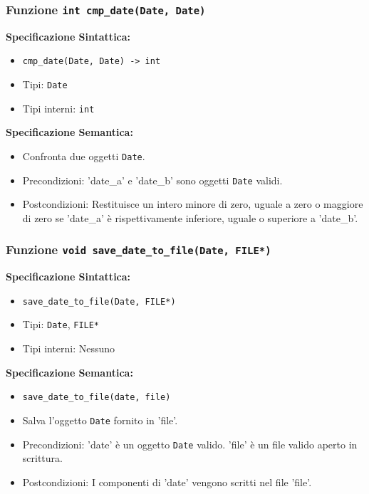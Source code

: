 \documentclass[11pt]{scrartcl} %
\begin{document}
\subsubsection{Funzione \texttt{int cmp\_date(Date, Date) }}

\textbf{Specificazione Sintattica:}
\begin{itemize}
	\item \texttt{cmp\_date(Date, Date) -> int}
	\item Tipi: \texttt{Date}
	\item Tipi interni: \texttt{int}
\end{itemize}

\textbf{Specificazione Semantica:}
\begin{itemize}
	\item Confronta due oggetti \texttt{Date}.
	\item Precondizioni: 'date\_a' e 'date\_b' sono oggetti \texttt{Date} validi.
	\item Postcondizioni: Restituisce un intero minore di zero, uguale a zero o maggiore di zero se 'date\_a' è rispettivamente inferiore, uguale o superiore a 'date\_b'.
\end{itemize}

\subsubsection{Funzione \texttt{void save\_date\_to\_file(Date, FILE*)}}

\textbf{Specificazione Sintattica:}
\begin{itemize}
	\item \texttt{save\_date\_to\_file(Date, FILE*)}
	\item Tipi: \texttt{Date}, \texttt{FILE*}
	\item Tipi interni: Nessuno
\end{itemize}

\textbf{Specificazione Semantica:}
\begin{itemize}
	\item \texttt{save\_date\_to\_file(date, file)}
	\item Salva l'oggetto \texttt{Date} fornito in 'file'.
	\item Precondizioni: 'date' è un oggetto \texttt{Date} valido. 'file' è un file valido aperto in scrittura.
	\item Postcondizioni: I componenti di 'date' vengono scritti nel file 'file'.
\end{itemize}
\end{document}
